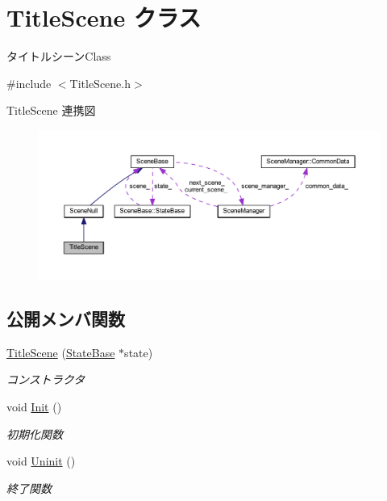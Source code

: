 \hypertarget{class_title_scene}{}\section{Title\+Scene クラス}
\label{class_title_scene}


タイトルシーン\+Class  




{\ttfamily \#include $<$Title\+Scene.\+h$>$}



Title\+Scene 連携図\nopagebreak
\begin{figure}[H]
\begin{center}
\leavevmode
\includegraphics[width=350pt]{class_title_scene__coll__graph}
\end{center}
\end{figure}
\subsection*{公開メンバ関数}
\begin{DoxyCompactItemize}
\item 
\mbox{\hyperlink{class_title_scene_a433ef854689b1c9defb29d9f999c52da}{Title\+Scene}} (\mbox{\hyperlink{class_scene_base_1_1_state_base}{State\+Base}} $\ast$state)
\begin{DoxyCompactList}\small\item\em コンストラクタ \end{DoxyCompactList}\item 
void \mbox{\hyperlink{class_title_scene_a28897f29ffe8725445bc0a27d7a865d1}{Init}} ()
\begin{DoxyCompactList}\small\item\em 初期化関数 \end{DoxyCompactList}\item 
void \mbox{\hyperlink{class_title_scene_a65fcb66cfab634ff7b0f6b69bbc63d7c}{Uninit}} ()
\begin{DoxyCompactList}\small\item\em 終了関数 \end{DoxyCompactList}\end{DoxyCompactItemize}
